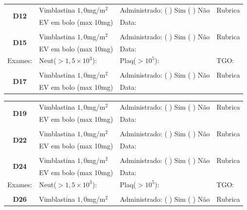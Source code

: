 \documentclass[11pt,a4paper,oldfontcommands]{memoir}
\begin{document}
\begin{center}
\begin{table}[H]
\begin{tabular}{p{1.3cm}p{5cm}|p{5cm}|p{3cm}}
    \hline
    \multicolumn{1}{c|}{\multirow{2}{*}{\textbf{D12}}}&{Vimblastina \(1,0\)mg/m\(^2\)}&{Administrado: (  ) Sim (  ) Não}&{Rubrica}\\
    \multicolumn{1}{c|}{}&{EV em bolo (max 10mg)}&{Data:}&\\
    \hline
    \\
   \hline
       \multicolumn{1}{c|}{\multirow{2}{*}{\textbf{D15}}}&{Vimblastina \(1,0\)mg/m\(^2\)}&{Administrado: (  ) Sim (  ) Não}&{Rubrica}\\
    \multicolumn{1}{c|}{}&{EV em bolo (max 10mg)}&{Data:}&\\
    \hline
    {Exames:}&{Neut(\(>1,5\times10^3\)):}&{Plaq(\(>10^5\)):}&{TGO:}
    \\
    \hline
    \\
    \hline
    \multicolumn{1}{c|}{\multirow{2}{*}{\textbf{D17}}}&{Vimblastina \(1,0\)mg/m\(^2\)}&{Administrado: (  ) Sim (  ) Não}&{Rubrica}\\
    \multicolumn{1}{c|}{}&{EV em bolo (max 10mg)}&{Data:}&\\
    \hline
\end{tabular}
\end{table}
\begin{table}[H]
\begin{tabular}{p{1.3cm}p{5cm}|p{5cm}|p{3cm}}
    \hline
    \multicolumn{1}{c|}{\multirow{2}{*}{\textbf{D19}}}&{Vimblastina \(1,0\)mg/m\(^2\)}&{Administrado: (  ) Sim (  ) Não}&{Rubrica}\\
    \multicolumn{1}{c|}{}&{EV em bolo (max 10mg)}&{Data:}&\\
    \hline
    \\
    \hline
    \multicolumn{1}{c|}{\multirow{2}{*}{\textbf{D22}}}&{Vimblastina \(1,0\)mg/m\(^2\)}&{Administrado: (  ) Sim (  ) Não}&{Rubrica}\\
    \multicolumn{1}{c|}{}&{EV em bolo (max 10mg)}&{Data:}&\\
    \hline
    \\
    \hline
    \multicolumn{1}{c|}{\multirow{2}{*}{\textbf{D24}}}&{Vimblastina \(1,0\)mg/m\(^2\)}&{Administrado: (  ) Sim (  ) Não}&{Rubrica}\\
    \multicolumn{1}{c|}{}&{EV em bolo (max 10mg)}&{Data:}&\\
    \hline
    {Exames:}&{Neut(\(>1,5\times10^3\)):}&{Plaq(\(>10^5\)):}&{TGO:}
    \\
    \hline\\
    \hline
    \multicolumn{1}{c|}{\multirow{2}{*}{\textbf{D26}}}&{Vimblastina \(1,0\)mg/m\(^2\)}&{Administrado: (  ) Sim (  ) Não}&{Rubrica}\\

\end{tabular}
\end{table}
\end{center}
\end{document}
